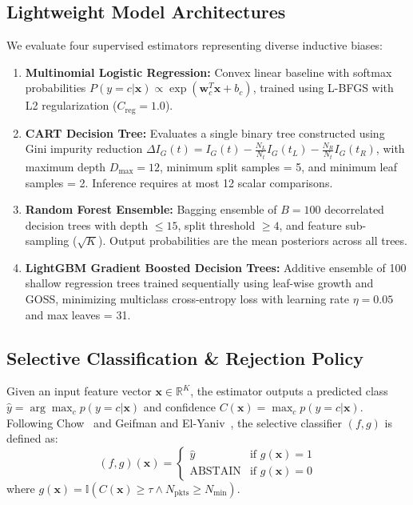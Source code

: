 \documentclass[conference]{IEEEtran}
\begin{document}
\subsection{Lightweight Model Architectures}
We evaluate four supervised estimators representing diverse inductive biases:
\begin{enumerate}
    \item \textbf{Multinomial Logistic Regression:} Convex linear baseline with softmax probabilities $P(y=c|\mathbf{x}) \propto \exp(\mathbf{w}_c^T \mathbf{x} + b_c)$, trained using L-BFGS with L2 regularization ($C_{\text{reg}} = 1.0$).
    \item \textbf{CART Decision Tree:} Evaluates a single binary tree constructed using Gini impurity reduction $\Delta I_G(t) = I_G(t) - \frac{N_L}{N_t}I_G(t_L) - \frac{N_R}{N_t}I_G(t_R)$, with maximum depth $D_{\text{max}} = 12$, minimum split samples = 5, and minimum leaf samples = 2. Inference requires at most 12 scalar comparisons.
    \item \textbf{Random Forest Ensemble:} Bagging ensemble of $B=100$ decorrelated decision trees with depth $\le 15$, split threshold $\ge 4$, and feature sub-sampling ($\sqrt{K}$). Output probabilities are the mean posteriors across all trees.
    \item \textbf{LightGBM Gradient Boosted Decision Trees:} Additive ensemble of 100 shallow regression trees trained sequentially using leaf-wise growth and GOSS, minimizing multiclass cross-entropy loss with learning rate $\eta = 0.05$ and max leaves = 31.
\end{enumerate}

\subsection{Selective Classification \& Rejection Policy}
Given an input feature vector $\mathbf{x} \in \mathbb{R}^K$, the estimator outputs a predicted class $\hat{y} = \arg\max_{c} p(y=c|\mathbf{x})$ and confidence $C(\mathbf{x}) = \max_{c} p(y=c|\mathbf{x})$. Following Chow~\cite{chow1970optimum} and Geifman and El-Yaniv~\cite{geifman2017selective}, the selective classifier $(f, g)$ is defined as:
\begin{equation}
    (f, g)(\mathbf{x}) = \begin{cases} \hat{y} & \text{if } g(\mathbf{x}) = 1 \\ \text{ABSTAIN} & \text{if } g(\mathbf{x}) = 0 \end{cases}
\end{equation}
where $g(\mathbf{x}) = \mathbb{I}\left(C(\mathbf{x}) \ge \tau \land N_{\text{pkts}} \ge N_{\text{min}}\right)$.
\end{document}
